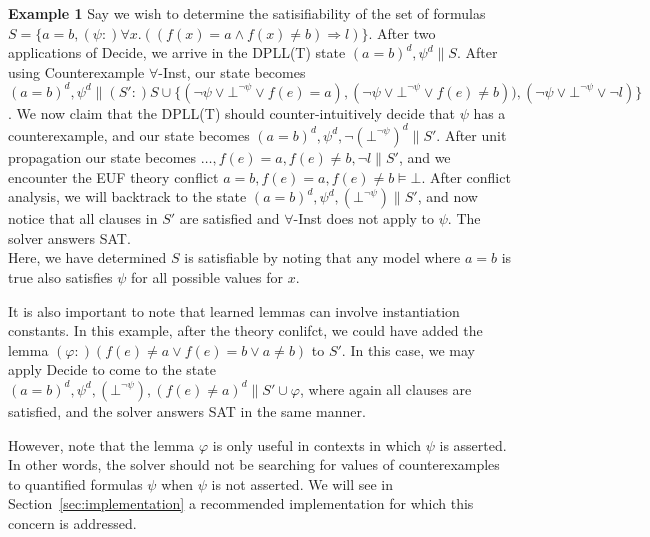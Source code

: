 \documentclass{llncs}
\begin{document}
{\bf Example 1}
Say we wish to determine the satisifiability of the set of formulas $S = \{ a = b, (\psi :) \forall x. ((f(x) = a \wedge f(x) \neq b) \Rightarrow l) \}$.
After two applications of Decide, we arrive in the DPLL(T) state $( a = b )^d, \psi^d \parallel S$.
After using Counterexample $\forall$-Inst, our state becomes $( a = b )^d, \psi^d \parallel (S':) S \cup \{ (\neg \psi \vee \bot^{\neg \psi} \vee f( e ) = a), (\neg \psi \vee \bot^{\neg \psi} \vee f( e ) \neq b)), (\neg \psi \vee \bot^{\neg \psi} \vee \neg l) \}$.
We now claim that the DPLL(T) should counter-intuitively decide that $\psi$ has a counterexample, and our state becomes $( a = b )^d, \psi^d, \neg (\bot^{\neg \psi})^d \parallel S'$. 
After unit propagation our state becomes $\ldots, f( e ) = a, f( e ) \neq b, \neg l \parallel S'$, and we encounter the EUF theory conflict $a = b, f( e ) = a, f( e ) \neq b \models \bot$.
After conflict analysis, we will backtrack to the state $( a = b )^d, \psi^d, (\bot^{\neg \psi}) \parallel S'$, and now notice that all clauses in $S'$ are satisfied and $\forall$-Inst does not apply to $\psi$.
The solver answers SAT. \\

Here, we have determined $S$ is satisfiable by noting that any model where $a = b$ is true also satisfies $\psi$ for all possible values for $x$.

It is also important to note that learned lemmas can involve instantiation constants.
In this example, after the theory conlifct, we could have added the lemma $(\varphi : ) ( f( e ) \neq a \vee f( e ) = b \vee a \neq b )$ to $S'$.
In this case, we may apply Decide to come to the state $( a = b )^d, \psi^d, (\bot^{\neg \psi}), (f( e ) \neq a)^d \parallel S' \cup \varphi$, where again all clauses are satisfied, and the solver answers SAT in the same manner.

However, note that the lemma $\varphi$ is only useful in contexts in which $\psi$ is asserted.
In other words, the solver should not be searching for values of counterexamples to quantified formulas $\psi$ when $\psi$ is not asserted.
We will see in Section~\ref{sec:implementation} a recommended implementation for which this concern is addressed.

\end{document}
